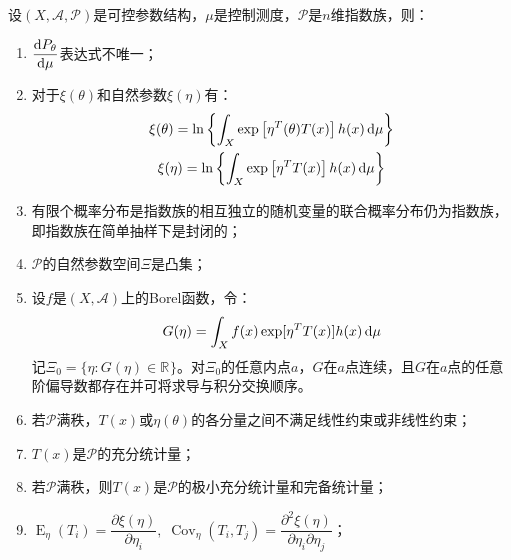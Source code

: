 \begin{property}\label{prop:ExponentialFamily}
	设$(X,\mathscr{A},\mathscr{P})$是可控参数结构，$\mu$是控制测度，$\mathscr{P}$是$n$维指数族，则：
	\begin{enumerate}
		\item $\dfrac{\mathop{}\!\mathrm{d} P_{\theta}}{\mathop{}\!\mathrm{d}\mu}$表达式不唯一；
		\item 对于$\xi(\theta)$和自然参数$\xi(\eta)$有：
		\begin{gather*}
			\xi(\theta)=\ln\left\{\int_{X}\exp\left[\eta^T(\theta)T(x)\right]h(x)\mathop{}\!\mathrm{d}\mu\right\} \\
			\xi(\eta)=\ln\left\{\int_{X}\exp\left[\eta^TT(x)\right]h(x)\mathop{}\!\mathrm{d}\mu\right\}
		\end{gather*}
		\item 有限个概率分布是指数族的相互独立的随机变量的联合概率分布仍为指数族，即指数族在简单抽样下是封闭的；
		\item $\mathscr{P}$的自然参数空间$\Xi$是凸集；
		\item 设$f$是$(X,\mathscr{A})$上的Borel函数，令：
		\begin{equation*}
			G(\eta)=\int_{X}f(x)\exp[\eta^TT(x)]h(x)\mathop{}\!\mathrm{d}\mu
		\end{equation*}
		记$\Xi_0=\{\eta:G(\eta)\in\mathbb{R}^{}\}$。对$\Xi_0$的任意内点$a$，$G$在$a$点连续，且$G$在$a$点的任意阶偏导数都存在并可将求导与积分交换顺序。
		\item 若$\mathscr{P}$满秩，$T(x)$或$\eta(\theta)$的各分量之间不满足线性约束或非线性约束；
		\item $T(x)$是$\mathscr{P}$的充分统计量；
		\item 若$\mathscr{P}$满秩，则$T(x)$是$\mathscr{P}$的极小充分统计量和完备统计量；
		\item $\operatorname{E}_{\eta}(T_i)=\dfrac{\partial\xi(\eta)}{\partial\eta_i},\;\operatorname{Cov}_{\eta}(T_i,T_j)=\dfrac{\partial^2\xi(\eta)}{\partial\eta_i\partial\eta_j}$；
	\end{enumerate}
\end{property}
